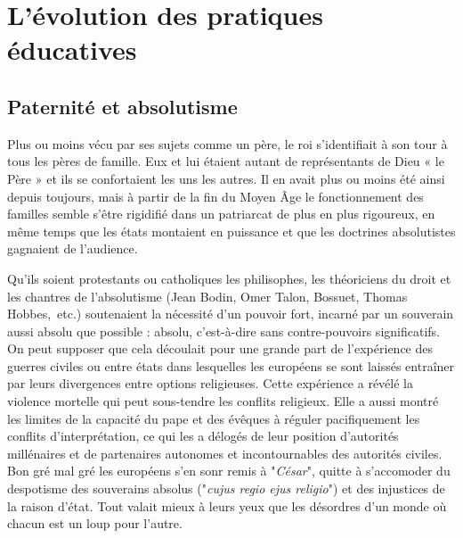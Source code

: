 
\chapter{L'évolution des pratiques éducatives}


 \section{Paternité et absolutisme}


Plus ou moins vécu par ses sujets comme un père, le roi s'identifiait à son tour à tous les pères de famille. Eux et lui étaient autant de représentants de Dieu « le Père » et ils se confortaient les uns les autres. Il en avait plus ou moins été ainsi depuis toujours, mais à partir de la fin du Moyen Âge le fonctionnement des familles semble s'être rigidifié dans un patriarcat de plus en plus rigoureux, en même temps que les états montaient en puissance et que les doctrines absolutistes gagnaient de l'audience. 

Qu'ils soient protestants ou catholiques les philisophes, les théoriciens du droit et les chantres de l'absolutisme (Jean Bodin, Omer Talon, Bossuet, Thomas Hobbes,~etc.) soutenaient la nécessité d'un pouvoir fort, incarné par un souverain aussi absolu que possible : absolu, c'est-à-dire sans contre-pouvoirs significatifs. On peut supposer que cela découlait pour une grande part de l'expérience des guerres civiles ou entre états dans lesquelles les européens se sont laissés entraîner par leurs divergences entre options religieuses. Cette expérience a révélé la violence mortelle qui peut sous-tendre les conflits religieux. Elle a aussi montré les limites de la capacité du pape et des évêques à réguler pacifiquement les conflits d'interprétation, ce qui les a délogés de leur position d'autorités millénaires et de partenaires autonomes et incontournables des autorités civiles. Bon gré mal gré les européens s'en sonr remis à "\emph{César}", quitte à s'accomoder du despotisme des souverains absolus ("\emph{cujus regio ejus religio}") et des injustices de la raison d'état. Tout valait mieux à leurs yeux que les désordres d'un monde où chacun est un loup pour l'autre. 

